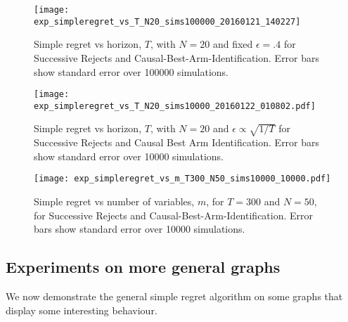 \begin{figure}
\caption{Simple regret vs horizon, $T$, with $N = 20$ and fixed $\epsilon = .4$ for Successive Rejects and Causal-Best-Arm-Identification. Error bars show standard error over 100000 simulations.}
\label{fig:simple_vs_T}
\centering
\texttt{[image: exp\_simpleregret\_vs\_T\_N20\_sims100000\_20160121\_140227]}
\end{figure}

\begin{figure}
\caption{Simple regret vs horizon, $T$, with $N = 20$ and $\epsilon \propto \sqrt{1/T}$ for Successive Rejects and Causal Best Arm Identification. Error bars show standard error over 10000 simulations.}
\label{fig:simple_vs_T_vary_epsilon}
\centering
\texttt{[image: exp\_simpleregret\_vs\_T\_N20\_sims10000\_20160122\_010802.pdf]}
\end{figure}

\iffalse
\begin{figure}
\caption{Simple regret vs number of variables, $N$, for $T=250$, for Successive Rejects and, Causal-Best-Arm-Identification. Error bars show standard error from 10000 simulations.}
\label{fig:simple_vs_N}
\centering
\texttt{[image: exp\_simpleregret\_vs\_N\_T250\_sims10000\_20160122\_024459.pdf]}
\end{figure}
\fi


\begin{figure}
\caption{Simple regret vs number of variables, $m$, for $T=300$ and $N = 50$, for Successive Rejects and Causal-Best-Arm-Identification. Error bars show standard error over 10000 simulations.}
\label{fig:simple_vs_m}
\centering
\texttt{[image: exp\_simpleregret\_vs\_m\_T300\_N50\_sims10000\_10000.pdf]}
\end{figure}

\iffalse
\begin{figure}
\caption{Simple regret vs number of variables, $N$, for $T=250$, for Successive Rejects and, Causal-Best-Arm-Identification on the confounded bandit problem. Error bars show standard error from 10000 simulations.}
\label{fig:simple_vs_N_confounded}
\centering
\texttt{[image: exp\_general\_simpleregret\_vs\_N\_T250\_sims10000\_20160131\_080208.pdf]}
\end{figure}
\fi

\subsection{Experiments on more general graphs}
We now demonstrate the general simple regret algorithm on some graphs that display some interesting behaviour.
 
